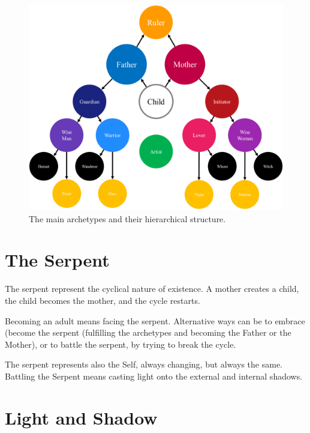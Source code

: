 \documentclass[
]{book}
\begin{document}
\begin{figure}

{\centering \includegraphics[width=\textwidth]{img/archetypes} 

}

\caption{The main archetypes and their hierarchical structure.}\label{fig:unnamed-chunk-15}
\end{figure}

\hypertarget{the-serpent}{%
\section{The Serpent}\label{the-serpent}}

The serpent represent the cyclical nature of existence. A mother creates a child, the child becomes the mother, and the cycle restarts.

Becoming an adult means facing the serpent. Alternative ways can be to embrace (become the serpent (fulfilling the archetypes and becoming the Father or the Mother), or to battle the serpent, by trying to break the cycle.

The serpent represents also the Self, always changing, but always the same. Battling the Serpent means casting light onto the external and internal shadows.

\hypertarget{light-and-shadow}{%
\section{Light and Shadow}\label{light-and-shadow}}
\end{document}
